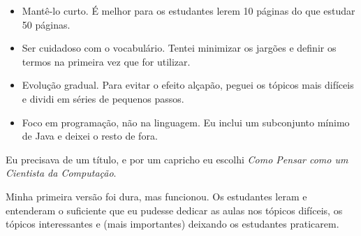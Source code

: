 \begin{itemize}

\item Mantê-lo curto. É melhor para os estudantes lerem 10 páginas do que 
	estudar 50 páginas.


\item Ser cuidadoso com o vocabulário. Tentei minimizar os jargões e definir 
	os termos na primeira vez que for utilizar.


\item Evolução gradual. Para evitar o efeito alçapão, peguei os tópicos mais 
	difíceis e dividi em séries de pequenos passos.


\item Foco em programação, não na linguagem. Eu inclui um subconjunto mínimo 
	de Java e deixei o resto de fora.
\end{itemize}


Eu precisava de um título, e por um capricho eu escolhi \emph{Como Pensar como 
um Cientista da Computação}.


Minha primeira versão foi dura, mas funcionou. Os estudantes leram e 
entenderam o suficiente que eu pudesse dedicar as aulas nos tópicos 
difíceis, os tópicos interessantes e (mais importantes) deixando os 
estudantes praticarem.


